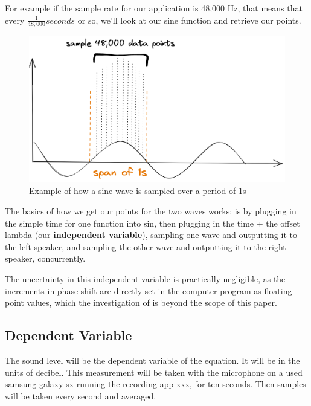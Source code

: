 \documentclass[index]{subfiles}
\begin{document}
For example if the sample rate for our application is 48,000 Hz, that means that every \(\frac{1}{48,000}seconds\) or so, we'll look at our sine function and retrieve our points.

\begin{figure}[H]
    \centering
    \includegraphics[scale=0.15]{sampling.png}
    \caption{Example of how a sine wave is sampled over a period of 1s}
\end{figure}

The basics of how we get our points for the two waves works: is by plugging in the simple time for one function into sin, then plugging in the time + the offset lambda (our \textbf{independent variable}), sampling one wave and outputting it to the left speaker, and sampling the other wave and outputting it to the right speaker, concurrently.


The uncertainty in this independent variable is practically negligible, as the increments in phase shift are directly set in the computer program as floating point values, which the investigation of is beyond the scope of this paper.

\subsection{Dependent Variable}

The sound level will be the dependent variable of the equation. It will be in the units of decibel. This measurement will be taken with the microphone on a used samsung galaxy sx running the recording app xxx, for ten seconds. Then samples will be taken every second and averaged.
\end{document}
